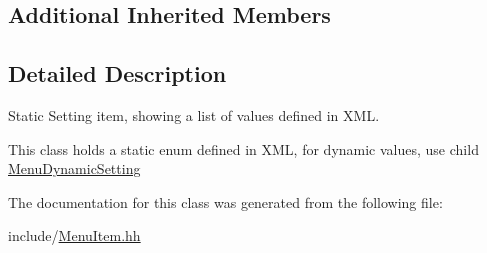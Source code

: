 \subsection*{Additional Inherited Members}


\subsection{Detailed Description}
Static Setting item, showing a list of values defined in X\+ML. 

This class holds a static enum defined in X\+ML, for dynamic values, use child \hyperlink{classMenuDynamicSetting}{Menu\+Dynamic\+Setting} 

The documentation for this class was generated from the following file\+:\begin{DoxyCompactItemize}
\item 
include/\hyperlink{MenuItem_8hh}{Menu\+Item.\+hh}\end{DoxyCompactItemize}
